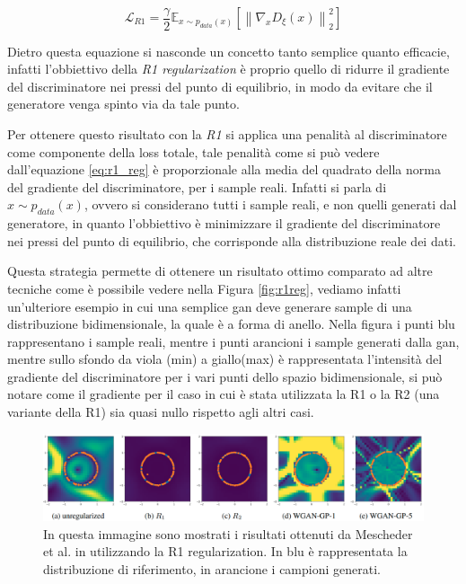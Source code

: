 \begin{equation}
    \label{eq:r1_reg}
    \mathcal{L}_{R1} = \frac{\gamma}{2} \mathbb{E}_{x \sim p_{data}(x)} \left[ \left\| \nabla_{x} D_{\xi}(x) \right\|_{2}^{2} \right]
\end{equation}

Dietro questa equazione si nasconde un concetto tanto semplice quanto efficacie, infatti l'obbiettivo della \textit{R1 regularization}
è proprio quello di ridurre il gradiente del discriminatore nei pressi del punto di equilibrio, in modo da evitare che il generatore
venga spinto via da tale punto.

Per ottenere questo risultato con la \textit{R1} si applica una penalità al discriminatore come componente della loss totale, tale penalità come si
può vedere dall'equazione \ref{eq:r1_reg} è proporzionale alla media del quadrato della norma del gradiente del discriminatore, per i sample reali.
Infatti si parla di $x \sim p_{data}(x)$, ovvero si considerano tutti i sample reali, e non quelli generati dal generatore, in quanto l'obbiettivo
è minimizzare il gradiente del discriminatore nei pressi del punto di equilibrio, che corrisponde alla distribuzione reale dei dati.

Questa strategia permette di ottenere un risultato ottimo comparato ad altre tecniche come è possibile vedere nella Figura \ref{fig:r1reg},
vediamo infatti un'ulteriore esempio in cui una semplice gan deve generare sample di una distribuzione bidimensionale, la quale è a 
forma di anello. Nella figura i punti blu rappresentano i sample reali, mentre i punti arancioni i sample generati dalla gan, 
mentre sullo sfondo da viola (min) a giallo(max) è rappresentata l'intensità del gradiente del discriminatore per i vari punti 
dello spazio bidimensionale, si può notare come il gradiente per il caso in cui è stata utilizzata la R1 o la R2 
(una variante della R1) sia quasi nullo rispetto agli altri casi.

    \begin{figure}[H]
        \centering
        \includegraphics[width=1.0\textwidth]{imgs/r1_reg.png}
        \caption{In questa immagine sono mostrati i risultati ottenuti da Mescheder et al. in \cite{mescheder2018training} 
            utilizzando la R1 regularization. In blu è rappresentata la distribuzione di riferimento, in arancione i campioni generati.}
        \label{fig:r1_reg}
    \end{figure}

